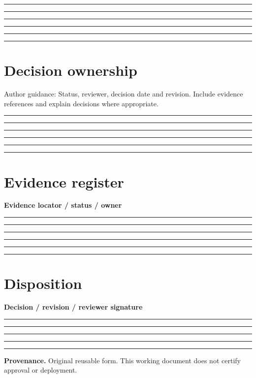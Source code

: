 \documentclass[11pt,letterpaper]{article}
\newcommand{\ResponseLine}{\par\vspace{1.05em}\noindent\rule{\linewidth}{0.4pt}\par}
\newcommand{\ResponseArea}{\ResponseLine\ResponseLine\ResponseLine}
\begin{document}
\ResponseArea\ResponseArea
\section{Decision ownership}
Author guidance: Status, reviewer, decision date and revision. Include evidence references and explain decisions where appropriate.


\ResponseArea\ResponseArea
\section{Evidence register}
\textbf{Evidence locator / status / owner}\ResponseArea\ResponseArea
\section{Disposition}
\textbf{Decision / revision / reviewer signature}\ResponseArea\ResponseLine
\vfill
\hrule
{\footnotesize\textbf{Provenance.} Original reusable form. This working document does not certify approval or deployment.}
\end{document}
